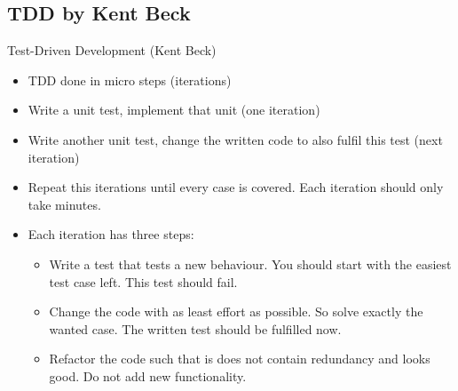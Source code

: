 \subsection*{TDD by Kent Beck}

\begin{frame}{Test-Driven Development (Kent Beck)}
\begin{itemize}
	\item TDD done in micro steps (iterations)
	\item Write a unit test, implement that unit (one iteration)
	\item Write another unit test, change the written code to also fulfil this test (next iteration)
	\item Repeat this iterations until every case is covered. Each iteration should only take minutes.
	\item Each iteration has three steps:
	\begin{itemize}
		\item Write a test that tests a new behaviour. You should start with the easiest test case left. This test should fail.
		\item Change the code with as least effort as possible. So solve exactly the wanted case. The written test should be fulfilled now.
		\item Refactor the code such that is does not contain redundancy and looks good. Do not add new functionality.
	\end{itemize}
\end{itemize}
\end{frame}

